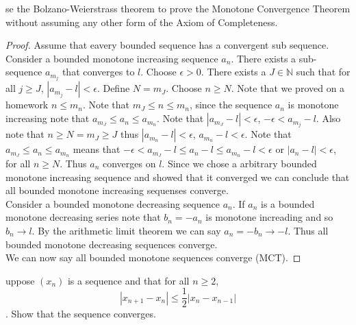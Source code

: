 \documentclass[12pt]{article}
\makeatletter
\theoremstyle{homework}
\newenvironment{exercise}[1]
{\def\@currentlabel{#1}\exercisecore}
{\endexercisecore}
\makeatother
\begin{document}
\begin{exercise}

Use the Bolzano-Weierstrass theorem to prove the Monotone Convergence Theorem without assuming any other form of the Axiom of Completeness.
\end{exercise}
\begin{proof}
Assume that eavery bounded sequence has a convergent sub sequence.\\
Consider a bounded monotone increasing sequence $a_n$.  There exists a sub-sequence $a_{m_j}$ that converges to $l$.  Choose $\epsilon>0$.  There exists a $J\in\mathbb{N}$ such that for all $j\geq J$, $|a_{m_j}-l|<\epsilon$.  Define $N=m_J$.  Choose $n\geq N$.  Note that we proved on a homework $n\leq m_n$.  Note that $m_J\leq n\leq m_n$, since the sequence $a_n$ is monotone increasing note that $a_{m_J}\leq a_n\leq a_{m_n}$.  Note that $|a_{m_J}-l|<\epsilon$, $-\epsilon<a_{m_j}-l$.  Also note that $n\geq N=m_J\geq J$ thus $|a_{m_n}-l|<\epsilon$, $a_{m_n}-l<\epsilon$.  Note that $a_{m_J}\leq a_n\leq a_{m_n}$ means that $-\epsilon< a_{m_J}-l\leq a_n-l\leq a_{m_n}-l<\epsilon$ or $|a_n-l|<\epsilon$, for all $n\geq N$.  Thus $a_n$ converges on $l$.  Since we chose a arbitrary bounded monotone increasing sequence and showed that it converged we can conclude that all bounded monotone increasing sequenses converge.\\
Consider a bounded monotone decreasing sequence $a_n$.  If $a_n$ is a bounded monotone decreasing series note that $b_n=-a_n$ is monotone increading and so $b_n\rightarrow l$.  By the arithmetic limit theorem we can say $a_n=-b_n\rightarrow -l$.  Thus all bounded monotone decreasing sequences converge.\\
We can now say all bounded monotone sequences converge (MCT).
\end{proof}
\begin{exercise}

Suppose $(x_n)$ is a sequence and that for all $n \geq 2$,
$$|x_{n+1} - x_n| \leq\frac{1}{2}|x_n - x_{n-1}|$$.
Show that the sequence converges.
\end{exercise}
\end{document}
